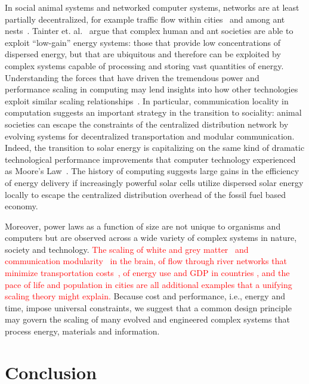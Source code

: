 \documentclass[12pt]{article}
\newcommand{\red}[1]{\textcolor{red}{#1}}
\begin{document}
In social animal systems and networked computer systems, networks
are at least partially decentralized, for example traffic flow within cities~\cite{samaniego2008cities} and among ant nests~\cite{flanagan2013fast}. Tainter et. al.~\cite{tainter2003resource} argue that complex human and ant societies are able to exploit ``low-gain'' energy systems: those that provide low concentrations of dispersed energy, but that are ubiquitous and therefore can be exploited by complex systems capable of processing and storing vast quantities of energy. Understanding the forces that have driven the tremendous power and performance scaling in computing may lend insights into how other technologies exploit similar scaling relationships~\cite{buchanan2016generalizing}. In particular, communication locality in computation suggests an important strategy in the transition to sociality: animal societies can escape the constraints of the centralized distribution network
by evolving systems for decentralized transportation and modular communication. Indeed, the transition to solar energy is capitalizing on the same kind of dramatic technological performance improvements that computer technology experienced as Moore's Law~\cite{farmer2016predictable}.  The history of computing suggests large gains in the efficiency of energy delivery if increasingly powerful solar cells utilize dispersed solar energy locally to escape the centralized distribution overhead of the fossil fuel based economy.
 
 Moreover, power laws as a function of size are not
unique to organisms and computers but are observed across a wide
variety of complex systems in nature, society and technology.  \red{The scaling of
white and grey matter~\cite{zhang00} and communication modularity~\cite{meunier2010modular} in the brain, of flow through river networks that minimize transportation costs~\cite{banavar2000topology}, of energy use and GDP in
countries \cite{brown11}, and the pace of life and population in cities
\cite{bettencourt07} are all additional examples that a unifying scaling theory might explain.}  Because cost and performance, i.e., energy and time, impose
universal constraints, we suggest that a common design principle may govern the
scaling of many evolved and engineered complex systems that process energy, materials and information.

\vspace{10 mm}
\section{Conclusion}
\end{document}
